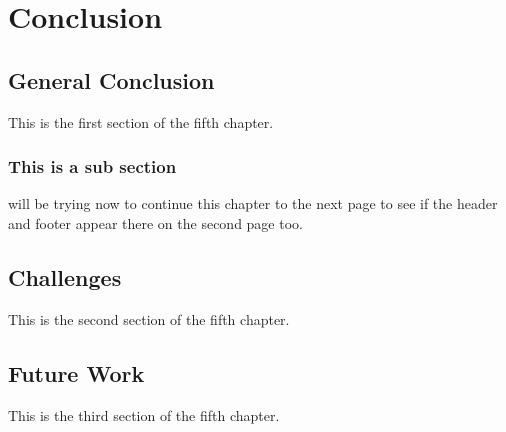\chapter{Conclusion} \label{Conclusion}
\section{General Conclusion} \label{General Conclusion}
This is the first section of the fifth chapter.

\subsection{This is a sub section} \label{This is a sub section}
will be trying now to continue this chapter to the next page to see if the header and footer appear there on the second page too.
\section{Challenges} \label{Challenges}
This is the second section of the fifth chapter.
\section{Future Work} \label{Future Work}
This is the third section of the fifth chapter.